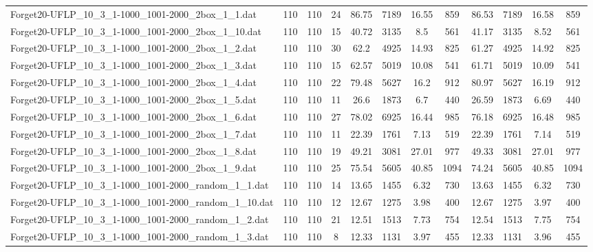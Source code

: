 \begin{sidewaystable}[!ht]
{\begin{tabular}{lccccccccccc}
Forget20-UFLP\_10\_3\_1-1000\_1001-2000\_2box\_1\_1.dat & 110 & 110 & 24 & 86.75 & 7189 &  \textcolor{blue2}{16.55} & 859 & 86.53 & 7189 & 16.58 & 859 \\
Forget20-UFLP\_10\_3\_1-1000\_1001-2000\_2box\_1\_10.dat & 110 & 110 & 15 & 40.72 & 3135 &  \textcolor{blue2}{8.5} & 561 & 41.17 & 3135 & 8.52 & 561 \\
Forget20-UFLP\_10\_3\_1-1000\_1001-2000\_2box\_1\_2.dat & 110 & 110 & 30 & 62.2 & 4925 & 14.93 & 825 & 61.27 & 4925 & 14.92 & 825 \\
Forget20-UFLP\_10\_3\_1-1000\_1001-2000\_2box\_1\_3.dat & 110 & 110 & 15 & 62.57 & 5019 &  \textcolor{blue2}{10.08} & 541 & 61.71 & 5019 & 10.09 & 541 \\
Forget20-UFLP\_10\_3\_1-1000\_1001-2000\_2box\_1\_4.dat & 110 & 110 & 22 & 79.48 & 5627 & 16.2 & 912 & 80.97 & 5627 &  \textcolor{blue2}{16.19} & 912 \\
Forget20-UFLP\_10\_3\_1-1000\_1001-2000\_2box\_1\_5.dat & 110 & 110 & 11 & 26.6 & 1873 & 6.7 & 440 & 26.59 & 1873 &  \textcolor{blue2}{6.69} & 440 \\
Forget20-UFLP\_10\_3\_1-1000\_1001-2000\_2box\_1\_6.dat & 110 & 110 & 27 & 78.02 & 6925 & 16.44 & 985 & 76.18 & 6925 & 16.48 & 985 \\
Forget20-UFLP\_10\_3\_1-1000\_1001-2000\_2box\_1\_7.dat & 110 & 110 & 11 & 22.39 & 1761 &  \textcolor{blue2}{7.13} & 519 & 22.39 & 1761 & 7.14 & 519 \\
Forget20-UFLP\_10\_3\_1-1000\_1001-2000\_2box\_1\_8.dat & 110 & 110 & 19 & 49.21 & 3081 &  \textcolor{blue2}{27.01} & 977 & 49.33 & 3081 &  \textcolor{blue2}{27.01} & 977 \\
Forget20-UFLP\_10\_3\_1-1000\_1001-2000\_2box\_1\_9.dat & 110 & 110 & 25 & 75.54 & 5605 &  \textcolor{blue2}{40.85} & 1094 & 74.24 & 5605 &  \textcolor{blue2}{40.85} & 1094 \\
Forget20-UFLP\_10\_3\_1-1000\_1001-2000\_random\_1\_1.dat & 110 & 110 & 14 & 13.65 & 1455 & 6.32 & 730 & 13.63 & 1455 & 6.32 & 730 \\
Forget20-UFLP\_10\_3\_1-1000\_1001-2000\_random\_1\_10.dat & 110 & 110 & 12 & 12.67 & 1275 & 3.98 & 400 & 12.67 & 1275 & 3.97 & 400 \\
Forget20-UFLP\_10\_3\_1-1000\_1001-2000\_random\_1\_2.dat & 110 & 110 & 21 & 12.51 & 1513 &  \textcolor{blue2}{7.73} & 754 & 12.54 & 1513 & 7.75 & 754 \\
Forget20-UFLP\_10\_3\_1-1000\_1001-2000\_random\_1\_3.dat & 110 & 110 & 8 & 12.33 & 1131 & 3.97 & 455 & 12.33 & 1131 &  \textcolor{blue2}{3.96} & 455 \\

\end{tabular}}
\end{sidewaystable}
